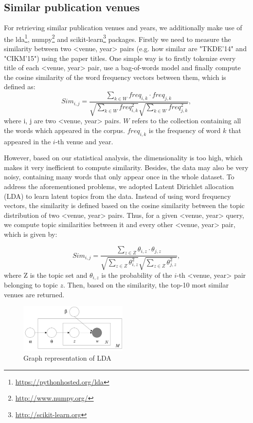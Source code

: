 \documentclass{sig-alternate-05-2015}
\begin{document}
\subsection{Similar publication venues}
For retrieving similar publication venues and years, we additionally make use of the lda\footnote{\url{https://pythonhosted.org/lda}}, numpy\footnote{\url{http://www.numpy.org/}} and scikit-learn\footnote{\url{http://scikit-learn.org}} packages. Firstly we need to measure the similarity between two <venue, year> pairs (e.g. how similar are "TKDE'14" and "CIKM'15") using the paper titles. One simple way is to firstly tokenize every title of each <venue, year> pair, use a bag-of-words model and finally compute the cosine similarity of the word frequency vectors between them, which is defined as:
\begin{equation*}
  Sim_{i, j} = \frac{\sum_{k\in W}freq_{i,k} \cdot freq_{j,k}}{\sqrt{\sum_{k\in W}freq_{i,k}^2}\sqrt{\sum_{k\in W}freq_{j,k}^2}},
\end{equation*}
where i, j are two <venue, year> pairs. $W$ refers to the collection containing all the words which appeared in the corpus. $freq_{i,k}$ is the frequency of word $k$ that appeared in the $i$-th venue and year.

However, based on our statistical analysis, the dimensionality is too high, which makes it very inefficient to compute similarity. Besides, the data may also be very noisy, containing many words that only appear once in the whole dataset. To address the aforementioned problems, we adopted Latent Dirichlet allocation (LDA)\cite{blei2003latent} to learn latent topics from the data. Instead of using word frequency vectors, the similarity is defined based on the cosine similarity between the topic distribution of two <venue, year> pairs. Thus, for a given <venue, year> query, we compute topic similarities between it and every other <venue, year> pair, which is given by:

\begin{equation*}
  Sim_{i, j} = \frac{\sum_{z\in Z}\theta_{i,z} \cdot \theta_{j,z}}{\sqrt{\sum_{z\in Z}\theta_{i,z}^2}\sqrt{\sum_{z\in Z}\theta_{j,z}^2}},
\end{equation*}
where Z is the topic set and $\theta_{i,z}$ is the probability of the $i$-th <venue, year> pair belonging to topic $z$. Then, based on the similarity, the top-10 most similar venues are returned.

\begin{figure}[th]
\centering
\includegraphics[width=0.48\textwidth]{img/LDA}
\caption{Graph representation of LDA}
\label{fig:lda}
\end{figure}
\end{document}
